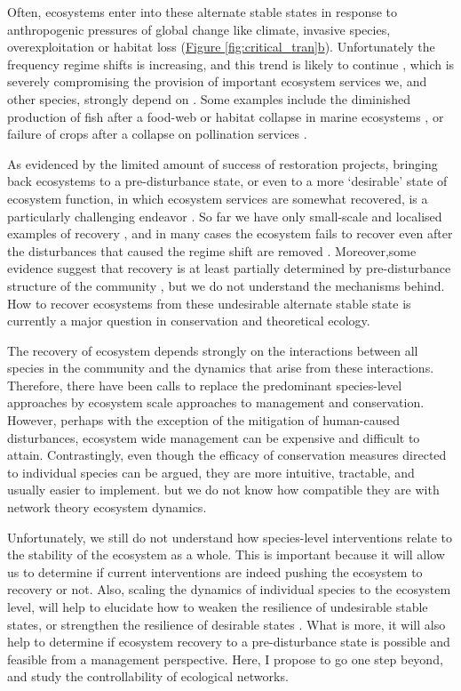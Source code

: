 \documentclass[a4paper]{article}
\begin{document}
Often, ecosystems enter into these alternate stable states in response to anthropogenic pressures of global change like climate, invasive species, overexploitation or habitat loss (\hyperref[fig:critical_tran]{Figure \ref{fig:critical_tran}b}).
Unfortunately the frequency regime shifts is increasing, and this trend is likely to continue \cite{Hughes2005}, which is severely compromising the provision of important ecosystem services we, and other species, strongly depend on \cite{Hughes2013a}.
Some examples include the diminished production of fish after a food-web or habitat collapse in marine ecosystems \cite{Hare2000, Daskalov2007, MacNeil2015}, or failure of crops after a collapse on pollination services \cite{Pauw2007,Lever2014}.

As evidenced by the limited amount of success of restoration projects, bringing back ecosystems to a pre-disturbance state, or even to a more `desirable' state of ecosystem function, in which ecosystem services are somewhat recovered, is a particularly challenging endeavor \cite{Graham2013a}.
So far we have only small-scale and localised examples of recovery \cite{Carpenter2006a, Stockwell2009}, and in many cases the ecosystem fails to recover even after the disturbances that caused the regime shift are removed \cite{Hughes2005}.
Moreover,some evidence suggest that recovery is at least partially determined by pre-disturbance structure of the community \cite{Graham2015}, but we do not understand the mechanisms behind.
How to recover ecosystems from these undesirable alternate stable state is currently a major question in conservation and theoretical ecology.

The recovery of ecosystem depends strongly on the interactions between all species in the community and the dynamics that arise from these interactions.
Therefore, there have been calls to replace the predominant species-level approaches by ecosystem scale approaches to management and conservation.
However, perhaps with the exception of the mitigation of human-caused disturbances, ecosystem wide management can be expensive and difficult to attain.
Contrastingly, even though the efficacy of conservation measures directed to individual species can be argued, they are more intuitive, tractable, and usually easier to implement.
 but we do not know how compatible they are with network theory ecosystem dynamics.

Unfortunately, we still do not understand how species-level interventions relate to the stability of the ecosystem as a whole.
This is important because it will allow us to determine if current interventions are indeed pushing the ecosystem to recovery or not.
Also, scaling the dynamics of individual species to the ecosystem level, will help to elucidate how to weaken the resilience of undesirable stable states, or strengthen the resilience of desirable states \cite{Graham2013a}.
What is more, it will also help to determine if ecosystem recovery to a pre-disturbance state is possible and feasible from a management perspective.
Here, I propose to go one step beyond, and study the controllability of ecological networks.
\end{document}
